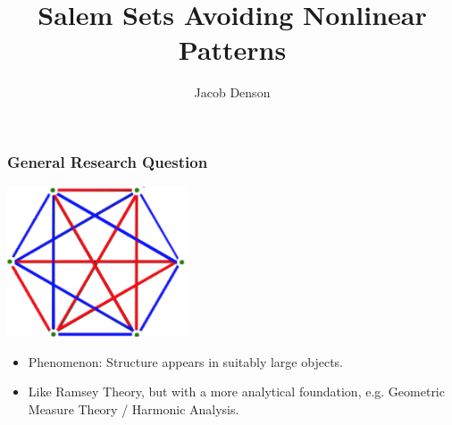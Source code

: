 \documentclass[usenames,dvipsnames,handout]{beamer}
\title{Salem Sets Avoiding Nonlinear Patterns}
\author{Jacob Denson}
\institute{}
\begin{document}
\maketitle




\begin{frame}
    \frametitle{General Research Question}

    \begin{center}
    \includegraphics[width=0.4\textwidth]{../Images/RamseyTheory}
    \end{center}

    \begin{itemize}
        \item Phenomenon: Structure appears in suitably large objects.

        \item Like Ramsey Theory, but with a more analytical foundation, e.g. Geometric Measure Theory / Harmonic Analysis.
    \end{itemize}
\end{frame}
\end{document}
